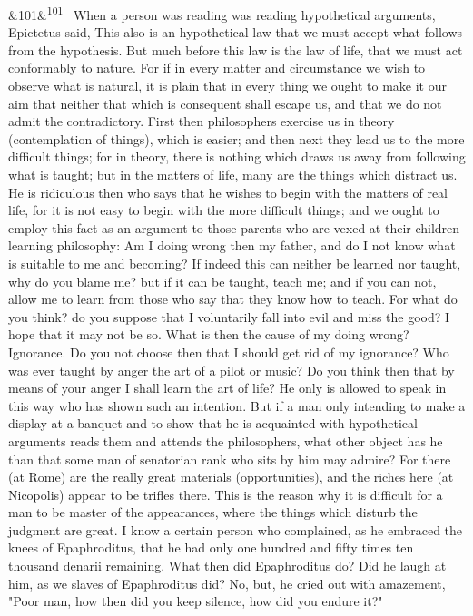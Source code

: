 \documentclass[12pt]{article}
\newcommand{\para}[1][]{\par\noindent\ifx&#1&\else\textsuperscript{\footnotesize #1}~\fi}
\begin{document}
\para[101] When a person was reading was reading hypothetical arguments, Epictetus said, This also is an hypothetical law that we must accept what follows from the hypothesis. But much before this law is the law of life, that we must act conformably to nature. For if in every matter and circumstance we wish to observe what is natural, it is plain that in every thing we ought to make it our aim that neither that which is consequent shall escape us, and that we do not admit the contradictory. First then philosophers exercise us in theory (contemplation of things), which is easier; and then next they lead us to the more difficult things; for in theory, there is nothing which draws us away from following what is taught; but in the matters of life, many are the things which distract us. He is ridiculous then who says that he wishes to begin with the matters of real life, for it is not easy to begin with the more difficult things; and we ought to employ this fact as an argument to those parents who are vexed at their children learning philosophy: Am I doing wrong then my father, and do I not know what is suitable to me and becoming? If indeed this can neither be learned nor taught, why do you blame me? but if it can be taught, teach me; and if you can not, allow me to learn from those who say that they know how to teach. For what do you think? do you suppose that I voluntarily fall into evil and miss the good? I hope that it may not be so. What is then the cause of my doing wrong? Ignorance. Do you not choose then that I should get rid of my ignorance? Who was ever taught by anger the art of a pilot or music? Do you think then that by means of your anger I shall learn the art of life? He only is allowed to speak in this way who has shown such an intention. But if a man only intending to make a display at a banquet and to show that he is acquainted with hypothetical arguments reads them and attends the philosophers, what other object has he than that some man of senatorian rank who sits by him may admire? For there (at Rome) are the really great materials (opportunities), and the riches here (at Nicopolis) appear to be trifles there. This is the reason why it is difficult for a man to be master of the appearances, where the things which disturb the judgment are great. I know a certain person who complained, as he embraced the knees of Epaphroditus, that he had only one hundred and fifty times ten thousand denarii remaining. What then did Epaphroditus do? Did he laugh at him, as we slaves of Epaphroditus did? No, but, he cried out with amazement, "Poor man, how then did you keep silence, how did you endure it?"
\end{document}
